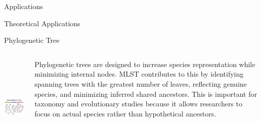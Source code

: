 \documentclass[xcolor=svgnames]{beamer}
\begin{document}
\begin{section}{Applications}
    \begin{subsection}{Theoretical Applications}
        \begin{frame}{Phylogenetic Tree}
\begin{columns}

    \begin{column}{0.5\textwidth}
        \centering
        \includegraphics[height=5cm]{pgtreer.png} %
        \end{column}
    
        \begin{column}{0.5\textwidth}
    Phylogenetic trees are designed to increase species representation while minimizing internal nodes. MLST contributes to this by identifying spanning trees with the greatest number of leaves, reflecting genuine species, and minimizing inferred shared ancestors. \newline \newline
    This is important for taxonomy and evolutionary studies because it allows researchers to focus on actual species rather than hypothetical ancestors.
    
    
    
    
    
        \end{column}
    
    \end{columns}
        

\end{frame}
\end{subsection}
\end{section}
\end{document}
